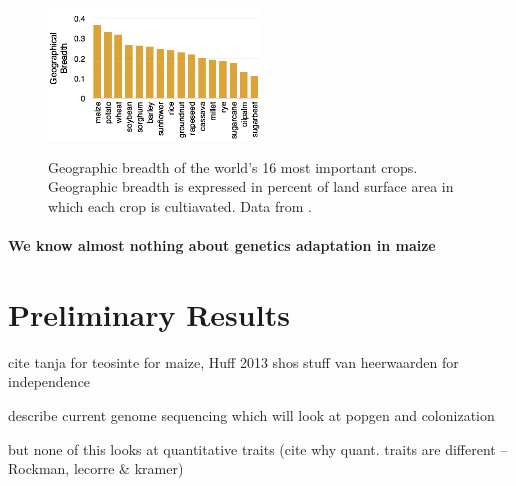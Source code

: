 \begin{figure}
  \centering
  \caption{Geographic breadth of the world's 16 most important crops. Geographic breadth is expressed in percent of land surface area in which each crop is cultiavated. Data from \citet{Ramankutty2008}. } 
   \includegraphics[width=0.5\textwidth]{breadth.png}
\label{fig:breadth}
\end{figure}

\paragraph*{We know almost nothing about genetics adaptation in maize}




\section*{Preliminary Results}

cite tanja for teosinte \citep{Pyhajarvi2013}
for maize, Huff 2013 \citep{Hufford2013}
shos stuff
van heerwaarden for independence \citep{Hufford2013}

describe current genome sequencing which will look at popgen and colonization

but none of this looks at quantitative traits (cite why quant. traits are different -- Rockman, lecorre \& kramer)

